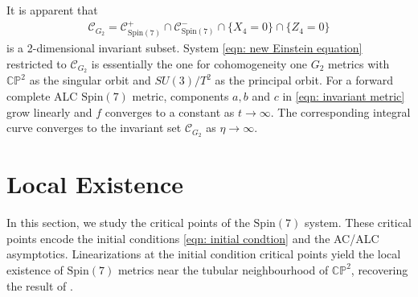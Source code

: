 \documentclass[11pt,letterpaper]{amsart}
\theoremstyle{definition}
\numberwithin{equation}{section}
\newcommand{\spin}{\mathrm{Spin}}
\begin{document}
It is apparent that 
\begin{equation}
\begin{split}
\mathcal{C}_{G_2}=\mathcal{C}^+_{\spin(7)}\cap \mathcal{C}^-_{\spin(7)} \cap \{X_4=0\}\cap \{Z_4=0\}
\end{split}
\end{equation}
is a 2-dimensional invariant subset. System \eqref{eqn: new Einstein equation} restricted to $\mathcal{C}_{G_2}$ is essentially the one for cohomogeneity one $G_2$ metrics with $\mathbb{CP}^2$ as the singular orbit and $SU(3)/T^2$ as the principal orbit. For a forward complete ALC $\spin(7)$ metric, components $a,b$ and $c$ in \eqref{eqn: invariant metric} grow linearly and $f$ converges to a constant as $t\to \infty$. The corresponding integral curve converges to the invariant set $\mathcal{C}_{G_2}$ as $\eta\to\infty$.

\section{Local Existence}
\label{sec: local analysis}
In this section, we study the critical points of the $\spin(7)$ system. These critical points encode the initial conditions \eqref{eqn: initial condtion} and the AC/ALC asymptotics. Linearizations at the initial condition critical points yield the local existence of $\spin(7) $ metrics near the tubular neighbourhood of $\mathbb{CP}^2$, recovering the result of \cite{reidegeld2011exceptional}.
\end{document}
